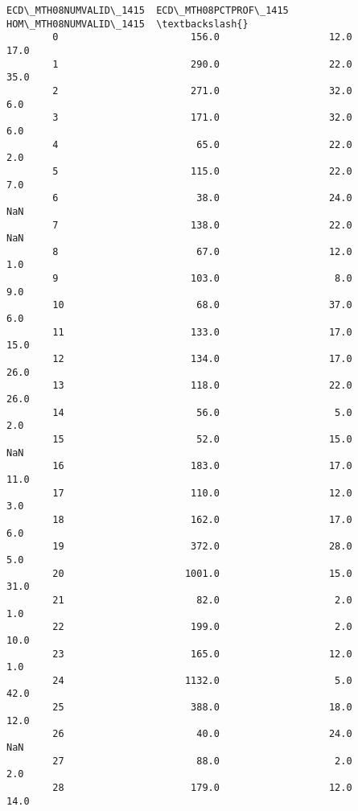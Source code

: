 \documentclass[11pt]{article}
\begin{document}
\begin{Verbatim}[commandchars=\\\{\}]
               ECD\_MTH08NUMVALID\_1415  ECD\_MTH08PCTPROF\_1415  HOM\_MTH08NUMVALID\_1415  \textbackslash{}
        0                       156.0                   12.0                    17.0   
        1                       290.0                   22.0                    35.0   
        2                       271.0                   32.0                     6.0   
        3                       171.0                   32.0                     6.0   
        4                        65.0                   22.0                     2.0   
        5                       115.0                   22.0                     7.0   
        6                        38.0                   24.0                     NaN   
        7                       138.0                   22.0                     NaN   
        8                        67.0                   12.0                     1.0   
        9                       103.0                    8.0                     9.0   
        10                       68.0                   37.0                     6.0   
        11                      133.0                   17.0                    15.0   
        12                      134.0                   17.0                    26.0   
        13                      118.0                   22.0                    26.0   
        14                       56.0                    5.0                     2.0   
        15                       52.0                   15.0                     NaN   
        16                      183.0                   17.0                    11.0   
        17                      110.0                   12.0                     3.0   
        18                      162.0                   17.0                     6.0   
        19                      372.0                   28.0                     5.0   
        20                     1001.0                   15.0                    31.0   
        21                       82.0                    2.0                     1.0   
        22                      199.0                    2.0                    10.0   
        23                      165.0                   12.0                     1.0   
        24                     1132.0                    5.0                    42.0   
        25                      388.0                   18.0                    12.0   
        26                       40.0                   24.0                     NaN   
        27                       88.0                    2.0                     2.0   
        28                      179.0                   12.0                    14.0   

\end{Verbatim}
\end{document}
